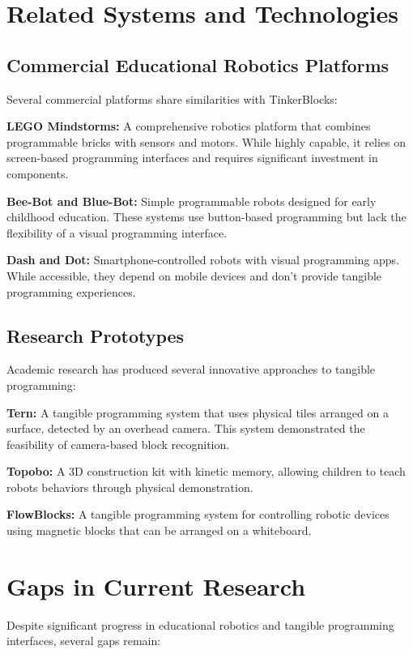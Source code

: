 \section{Related Systems and Technologies}

\subsection{Commercial Educational Robotics Platforms}

Several commercial platforms share similarities with TinkerBlocks:

\textbf{LEGO Mindstorms:} A comprehensive robotics platform that combines programmable bricks with sensors and motors. While highly capable, it relies on screen-based programming interfaces and requires significant investment in components.

\textbf{Bee-Bot and Blue-Bot:} Simple programmable robots designed for early childhood education. These systems use button-based programming but lack the flexibility of a visual programming interface.

\textbf{Dash and Dot:} Smartphone-controlled robots with visual programming apps. While accessible, they depend on mobile devices and don't provide tangible programming experiences.

\subsection{Research Prototypes}

Academic research has produced several innovative approaches to tangible programming:

\textbf{Tern:} A tangible programming system that uses physical tiles arranged on a surface, detected by an overhead camera. This system demonstrated the feasibility of camera-based block recognition.

\textbf{Topobo:} A 3D construction kit with kinetic memory, allowing children to teach robots behaviors through physical demonstration.

\textbf{FlowBlocks:} A tangible programming system for controlling robotic devices using magnetic blocks that can be arranged on a whiteboard.

\section{Gaps in Current Research}

Despite significant progress in educational robotics and tangible programming interfaces, several gaps remain:

